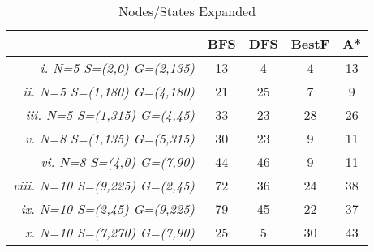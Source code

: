\begin{table}[ht]
\centering
\begin{tabular}{r|c|c|c|c|}
\cline{2-5}
\multicolumn{1}{l|}{} & \textbf{BFS} & \textbf{DFS} & \textbf{BestF} & \textbf{A*} \\ \hline
\multicolumn{1}{|r|}{\textit{i. N=5 S=(2,0) G=(2,135)}} & 13 & 4 & 4 & 13 \\ \hline
\multicolumn{1}{|r|}{\textit{ii. N=5 S=(1,180) G=(4,180)}} & 21 & 25 & 7 & 9 \\ \hline
\multicolumn{1}{|r|}{\textit{iii. N=5 S=(1,315) G=(4,45)}} & 33 & 23 & 28 & 26 \\ \hline
\multicolumn{1}{|r|}{\textit{v. N=8 S=(1,135) G=(5,315)}} & 30 & 23 & 9 & 11 \\ \hline
\multicolumn{1}{|r|}{\textit{vi. N=8 S=(4,0) G=(7,90)}} & 44 & 46 & 9 & 11 \\ \hline
\multicolumn{1}{|r|}{\textit{viii. N=10 S=(9,225) G=(2,45)}} & 72 & 36 & 24 & 38 \\ \hline
\multicolumn{1}{|r|}{\textit{ix. N=10 S=(2,45) G=(9,225)}} & 79 & 45 & 22 & 37 \\ \hline
\multicolumn{1}{|r|}{\textit{x. N=10 S=(7,270) G=(7,90)}} & 25 & 5 & 30 & 43 \\ \hline
\end{tabular}
\caption{Nodes/States Expanded			}
\label{tab:nodes-expanded}
\end{table}